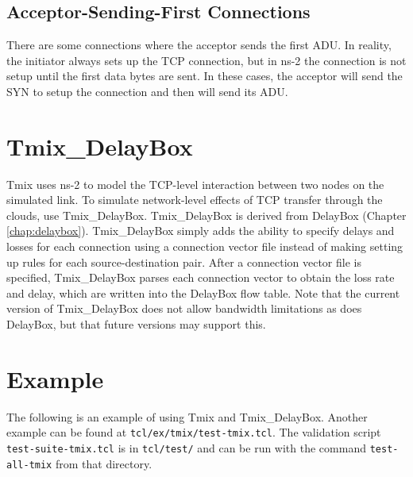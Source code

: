 \subsection{Acceptor-Sending-First Connections}
There are some connections where the acceptor sends the first ADU\@.  In reality, the initiator always sets up the TCP connection, but in ns-2 the connection is not setup until the first data bytes are sent.  In these cases, the acceptor will send the SYN to setup the connection and then will send its ADU\@.

\section{Tmix\_DelayBox}
\label{sec:tmix-db}

Tmix uses ns-2 to model the TCP-level interaction between two nodes on
the simulated link. To simulate network-level effects of TCP transfer
through the clouds, use Tmix\_DelayBox. Tmix\_DelayBox is derived from
DelayBox (Chapter \ref{chap:delaybox}).  Tmix\_DelayBox simply adds
the ability to specify delays and losses for each connection using a
connection vector file instead of making setting up rules for each
source-destination pair.  After a connection vector file is specified,
Tmix\_DelayBox parses each connection vector to obtain the loss rate and
delay, which are written into the DelayBox flow table.  Note that the current version of Tmix\_DelayBox does not allow bandwidth limitations as does DelayBox, but that future versions may support this.

\section{Example}
The following is an example of using Tmix and Tmix\_DelayBox.  Another example can be found at {\tt tcl/ex/tmix/test-tmix.tcl}.  The
validation script {\tt test-suite-tmix.tcl} is in {\tt tcl/test/} and
can be run with the command {\tt test-all-tmix} from that directory.

